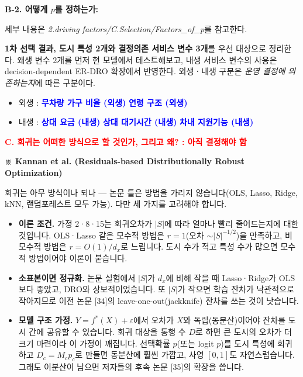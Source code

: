 \documentclass[10pt,a4paper]{article}
\newcommand{\hd}[1]{\par\vspace{8pt}\textbf{#1}\par\vspace{3pt}}
\newcommand{\red}[1]{\textcolor{red}{#1}}
\begin{document}
\item \textbf{B-2. 어떻게 $p$를 정하는가: }

세부 내용은 \textit{2.driving factors/C.Selection/Factors\_of\_p}를 참고한다.

\textbf{1차 선택 결과, 도시 특성 2개와 결정의존 서비스 변수 3개}를 우선 대상으로 정리한다. 왜생 변수 2개를 먼저 현 모델에서 테스트해보고, 내생 서비스 변수의 사용은 decision-dependent ER-DRO 확장에서 반영한다. 외생ㆍ내생 구분은 \emph{운영 결정에 의존하는지}에 따른 구분이다.

\begin{itemize}
\item 외생 : \textcolor{blue}{\textbf{무차량 가구 비율 (외생)} \quad \textbf{연령 구조 (외생)}}
\item 내생 : \textcolor{blue}{\textbf{상대 요금 (내생)} \quad \textbf{상대 대기시간 (내생)} \quad
\textbf{차내 지원기능 (내생)}}
\end{itemize}


\hd{\textbf{\red{C. 회귀는 어떠한 방식으로 할 것인가, 그리고 왜? : 아직 결정해야 함}}}
\begin{framed}
\textbf{※ Kannan et al. (Residuals-based Distributionally Robust Optimization)}

회귀는 아무 방식이나 되나 --- 논문 틀은 방법을 가리지 않습니다(OLS, Lasso, Ridge, kNN, 랜덤포레스트 모두 가능). 다만 세 가지를 고려해야 합니다.
\begin{itemize}[leftmargin=1.5em]
\item \textbf{이론 조건.} 가정 2·8·15는 회귀오차가 $|S|$에 따라 얼마나 빨리 줄어드는지에 대한 것입니다. OLS·Lasso 같은 모수적 방법은 $r=1$(오차 $\sim |S|^{-1/2}$)을 만족하고, 비모수적 방법은 $r=O(1)/d_x$로 느립니다. 도시 수가 적고 특성 수가 많으면 모수적 방법이어야 이론이 붙습니다.
\item \textbf{소표본이면 정규화.} 논문 실험에서 $|S|$가 $d_x$에 비해 작을 때 Lasso·Ridge가 OLS보다 좋았고, DRO와 상보적이었습니다. 또 $|S|$가 작으면 학습 잔차가 낙관적으로 작아지므로 이전 논문 [34]의 leave-one-out(jackknife) 잔차를 쓰는 것이 낫습니다.
\item \textbf{모델 구조 가정.} $Y=f^*(X)+\varepsilon$에서 오차가 $X$와 독립(동분산)이어야 잔차를 도시 간에 공유할 수 있습니다. 회귀 대상을 통행 수 $D$로 하면 큰 도시의 오차가 더 크기 마련이라 이 가정이 깨집니다. 선택확률 $p$(또는 logit $p$)를 도시 특성에 회귀하고 $D_c=M_cp_c$로 만들면 동분산에 훨씬 가깝고, 사영 $[0,1]$도 자연스럽습니다. 그래도 이분산이 남으면 저자들의 후속 논문 [35]의 확장을 씁니다.
\end{itemize}

\end{framed}
\end{document}

